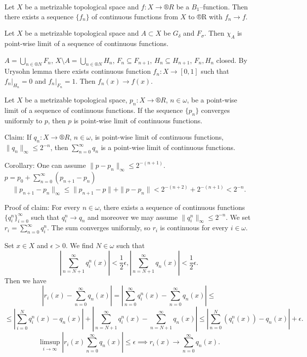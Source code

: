 \documentclass[12pt]{article}					%
\begin{document}
\begin{veta}
	Let $X$ be a metrizable topological space and $f: X \rightarrow ®R$ be a $B_1$–function. Then there exists a sequence $\{f_n\}$ of continuous functions from $X$ to ®R with $f_n \rightarrow f$.
\end{veta}

\begin{lemma}
	Let $X$ be a metrizable topological space and $A \subset X$ be $G_\delta$ and $F_\sigma$. Then $\chi_A$ is point-wise limit of a sequence of continuous functions.

	\begin{dukazin}
		$A = \bigcup_{n \in ®N} F_n$, $X \setminus A = \bigcup_{n \in ®N} H_n$, $F_n \subseteq F_{n+1}$, $H_n \subseteq H_{n+1}$, $F_n, H_n$ closed. By Urysohn lemma there exists continuous function $f_n: X \rightarrow [0, 1]$ such that $f_n|_{H_n} = 0$ and $f_n|_{F_n} = 1$. Then $f_n(x) \rightarrow f(x)$.
	\end{dukazin}
\end{lemma}


\begin{lemma}
	Let $X$ be a metrizable topological space, $p_n: X \rightarrow ®R$, $n \in \omega$, be a point-wise limit of a sequence of continuous functions. If the sequence $\{p_n\}$ converges uniformly to $p$, then $p$ is point-wise limit of continuous functions.

	\begin{dukazin}
		Claim: If $q_n: X \rightarrow ®R$, $n \in \omega$, is point-wise limit of continuous functions, $\|q_n\|_∞ ≤ 2^{-n}$, then $\sum_{n=0}^∞ q_n$ is a point-wise limit of continuous functions.

		Corollary: One can assume $\|p - p_n\|_∞ ≤ 2^{-(n+1)}$. $p = p_0 + \sum_{n=0}^∞ (p_{n+1} - p_n)$
		$$ \|p_{n+1} - p_n\|_∞ ≤ \|p_{n+1} - p\| + \|p - p_n\| < 2^{-(n+2)} + 2^{-(n+1)} < 2^{-n}. $$

		Proof of claim: For every $n \in \omega$, there exists a sequence of continuous functions $\{q_i^n\}_{i=0}^∞$ such that $q_i^n \rightarrow q_n$ and moreover we may assume $\|q_i^n\|_∞ ≤ 2^{-n}$. We set $r_i = \sum_{n=0}^∞ q_i^n$. The sum converges uniformly, so $r_i$ is continuous for every $i \in \omega$.

		Set $x \in X$ and $\epsilon > 0$. We find $N \in \omega$ such that
		$$ \left|\sum_{n=N+1}^∞ q_i^n(x)\right| < \frac{1}{2}\epsilon, \left|\sum_{n=N+1}^∞ q_n(x)\right| < \frac{1}{2}\epsilon. $$
		Then we have
		$$ \left|r_i(x) - \sum_{n=0}^∞ q_n(x)\right| = \left|\sum_{n=0}^∞ q_i^n(x) - \sum_{n=0}^∞ q_n(x)\right| ≤ $$
		$$ ≤ \left|\sum_{i=0}^N q_i^n(x) - q_n(x)\right| + \left|\sum_{n=N+1}^∞ q_i^n(x) - \sum_{n=N+1}^∞ q_n(x)\right| ≤ \left|\sum_{n=0}^N (q_i^n(x)) - q_n(x) \right| + \epsilon. $$
		$$ \limsup_{i \rightarrow ∞} |r_i(x) \sum_{n=0}^∞ q_n(x)| ≤ \epsilon \implies r_i(x) \rightarrow \sum_{n=0}^∞ q_n(x). $$
	\end{dukazin}
\end{lemma}
\end{document}
